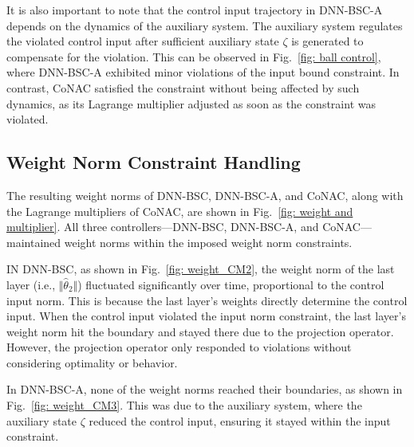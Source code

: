 \documentclass[lettersize,journal]{IEEEtran}
\begin{document}
It is also important to note that the control input trajectory in DNN-BSC-A depends on the dynamics of the auxiliary system. The auxiliary system regulates the violated control input after sufficient auxiliary state $\zeta$ is generated to compensate for the violation. This can be observed in Fig.~\ref{fig: ball control}, where DNN-BSC-A exhibited minor violations of the input bound constraint. In contrast, CoNAC satisfied the constraint without being affected by such dynamics, as its Lagrange multiplier adjusted as soon as the constraint was violated.


\subsection{Weight Norm Constraint Handling}

The resulting weight norms of DNN-BSC, DNN-BSC-A, and CoNAC, along with the Lagrange multipliers of CoNAC, are shown in Fig.~\ref{fig: weight and multiplier}. All three controllers—DNN-BSC, DNN-BSC-A, and CoNAC—maintained weight norms within the imposed weight norm constraints.

IN DNN-BSC, as shown in Fig.~\ref{fig: weight_CM2}, the weight norm of the last layer (i.e., $\Vert {{{\hat \theta }_2}} \Vert$) fluctuated significantly over time, proportional to the control input norm. This is because the last layer’s weights directly determine the control input. When the control input violated the input norm constraint, the last layer’s weight norm hit the boundary and stayed there due to the projection operator. However, the projection operator only responded to violations without considering optimality or behavior.

In DNN-BSC-A, none of the weight norms reached their boundaries, as shown in Fig.~\ref{fig: weight_CM3}. This was due to the auxiliary system, where the auxiliary state $\zeta$ reduced the control input, ensuring it stayed within the input constraint.
\end{document}
